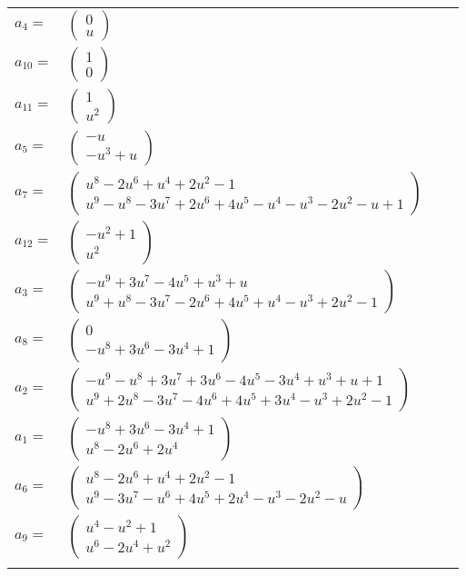 \documentclass[1p]{elsarticle_modified}
\theoremstyle{definition}
\begin{document}
\begin{tabular}{m{7pt} m{180pt} m{7pt} m{180pt} }
\flushright $a_{4}=$&$\begin{pmatrix}0\\u\end{pmatrix}$ \\
\flushright $a_{10}=$&$\begin{pmatrix}1\\0\end{pmatrix}$ \\
\flushright $a_{11}=$&$\begin{pmatrix}1\\u^2\end{pmatrix}$ \\
\flushright $a_{5}=$&$\begin{pmatrix}- u\\- u^3+u\end{pmatrix}$ \\
\flushright $a_{7}=$&$\begin{pmatrix}u^8-2 u^6+u^4+2 u^2-1\\u^9- u^8-3 u^7+2 u^6+4 u^5- u^4- u^3-2 u^2- u+1\end{pmatrix}$ \\
\flushright $a_{12}=$&$\begin{pmatrix}- u^2+1\\u^2\end{pmatrix}$ \\
\flushright $a_{3}=$&$\begin{pmatrix}- u^9+3 u^7-4 u^5+u^3+u\\u^9+u^8-3 u^7-2 u^6+4 u^5+u^4- u^3+2 u^2-1\end{pmatrix}$ \\
\flushright $a_{8}=$&$\begin{pmatrix}0\\- u^8+3 u^6-3 u^4+1\end{pmatrix}$ \\
\flushright $a_{2}=$&$\begin{pmatrix}- u^9- u^8+3 u^7+3 u^6-4 u^5-3 u^4+u^3+u+1\\u^9+2 u^8-3 u^7-4 u^6+4 u^5+3 u^4- u^3+2 u^2-1\end{pmatrix}$ \\
\flushright $a_{1}=$&$\begin{pmatrix}- u^8+3 u^6-3 u^4+1\\u^8-2 u^6+2 u^4\end{pmatrix}$ \\
\flushright $a_{6}=$&$\begin{pmatrix}u^8-2 u^6+u^4+2 u^2-1\\u^9-3 u^7- u^6+4 u^5+2 u^4- u^3-2 u^2- u\end{pmatrix}$ \\
\flushright $a_{9}=$&$\begin{pmatrix}u^4- u^2+1\\u^6-2 u^4+u^2\end{pmatrix}$\\&\end{tabular}
\end{document}
